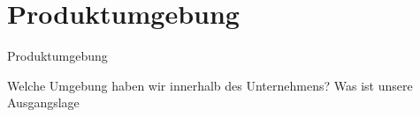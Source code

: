 \section{Produktumgebung}

Produktumgebung

Welche Umgebung haben wir innerhalb des Unternehmens? Was ist unsere Ausgangslage


